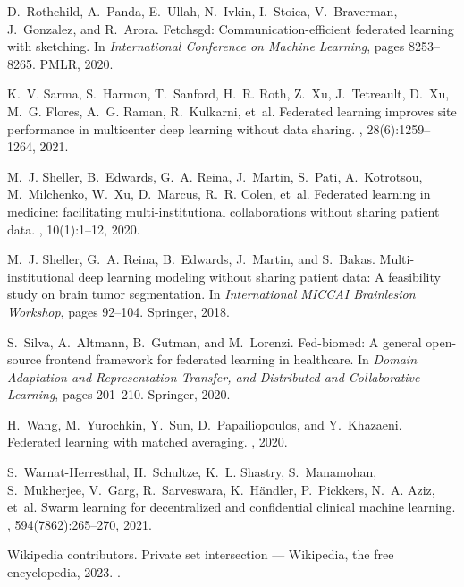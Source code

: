 \documentclass[11pt]{article}
\begin{document}
\begin{thebibliography}{10}
D.~Rothchild, A.~Panda, E.~Ullah, N.~Ivkin, I.~Stoica, V.~Braverman,
  J.~Gonzalez, and R.~Arora.
\newblock Fetchsgd: Communication-efficient federated learning with sketching.
\newblock In {\em International Conference on Machine Learning}, pages
  8253--8265. PMLR, 2020.

K.~V. Sarma, S.~Harmon, T.~Sanford, H.~R. Roth, Z.~Xu, J.~Tetreault, D.~Xu,
  M.~G. Flores, A.~G. Raman, R.~Kulkarni, et~al.
\newblock Federated learning improves site performance in multicenter deep
  learning without data sharing.
,
  28(6):1259--1264, 2021.

M.~J. Sheller, B.~Edwards, G.~A. Reina, J.~Martin, S.~Pati, A.~Kotrotsou,
  M.~Milchenko, W.~Xu, D.~Marcus, R.~R. Colen, et~al.
\newblock Federated learning in medicine: facilitating multi-institutional
  collaborations without sharing patient data.
, 10(1):1--12, 2020.

M.~J. Sheller, G.~A. Reina, B.~Edwards, J.~Martin, and S.~Bakas.
\newblock Multi-institutional deep learning modeling without sharing patient
  data: A feasibility study on brain tumor segmentation.
\newblock In {\em International MICCAI Brainlesion Workshop}, pages 92--104.
  Springer, 2018.

S.~Silva, A.~Altmann, B.~Gutman, and M.~Lorenzi.
\newblock Fed-biomed: A general open-source frontend framework for federated
  learning in healthcare.
\newblock In {\em Domain Adaptation and Representation Transfer, and
  Distributed and Collaborative Learning}, pages 201--210. Springer, 2020.

H.~Wang, M.~Yurochkin, Y.~Sun, D.~Papailiopoulos, and Y.~Khazaeni.
\newblock Federated learning with matched averaging.
, 2020.

S.~Warnat-Herresthal, H.~Schultze, K.~L. Shastry, S.~Manamohan, S.~Mukherjee,
  V.~Garg, R.~Sarveswara, K.~H{\"a}ndler, P.~Pickkers, N.~A. Aziz, et~al.
\newblock Swarm learning for decentralized and confidential clinical machine
  learning.
, 594(7862):265--270, 2021.

{Wikipedia contributors}.
\newblock Private set intersection --- {Wikipedia}{,} the free encyclopedia,
  2023.
.


\end{thebibliography}
\end{document}
